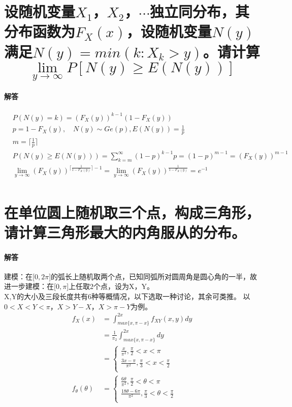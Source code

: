 \documentclass[UTF8]{ctexart}
\begin{document}
\section{设随机变量$X_1$，$X_2$，$\cdots$独立同分布，其分布函数为$F_X(x)$，设随机变量$N(y)$满足$N(y)=min(k:X_k>y)$。请计算$$\lim_{y\to\infty}P[N(y)\geq E(N(y))]$$}
\paragraph{解答}
\begin{equation*}
\begin{aligned}
&P(N(y)=k)=(F_X(y))^{k-1}(1-F_X(y))\\
&p=1-F_X(y), \quad N(y)\sim Ge(p), E(N(y))=\frac{1}{p}\\
&m=\lceil \frac{1}{p} \rceil \\
&P(N(y)\geq E(N(y)))=\sum\limits _{k=m}^\infty (1-p)^{k-1}p=(1-p)^{m-1}=(F_X(y))^{m-1}\\
&\lim_{y\to\infty}(F_X(y))^{\lceil \frac{1}{1-F_X(y)}\rceil-1}=\lim_{y\to\infty}
(F_X(y))^{\frac{1}{1-F_X(y)}}=e^{-1}\\
\end{aligned}
\end{equation*}
\section{在单位圆上随机取三个点，构成三角形，请计算三角形最大的内角服从的分布。}
\paragraph{解答}
建模：在[$0,2\pi$]的弧长上随机取两个点，已知同弧所对圆周角是圆心角的一半，故进一步建模：在[$0,\pi$]上任取2个点，设为X，Y。\\
X,Y的大小及三段长度共有6种等概情况，以下选取一种讨论，其余可类推。
以$0<X<Y<\pi$，$X>Y-X$，$X>\pi-Y$为例。
\begin{equation*}
\begin{aligned}
f_X(x)&=\int_{max\{x,\pi-x\}}^{2x}f_{XY}(x,y)dy\\
&=\frac{1}{\pi_2}\int_{max\{x,\pi-x\}}^{2x}dy\\
&=\begin{cases}
\frac{x}{\pi^2}, \frac{\pi}{2}<x<\pi\\
\frac{3x-\pi}{\pi^2},\frac{\pi}{3}<x<\frac{\pi}{2}\\
\end{cases}\\
f_{\theta}(\theta)&=\begin{cases}
\frac{6\theta}{\pi^2}, \frac{\pi}{2}<\theta<\pi\\
\frac{18\theta-6\pi}{\pi^2},\frac{\pi}{3}<\theta<\frac{\pi}{2}\\
\end{cases}
\end{aligned}
\end{equation*}
\end{document}
